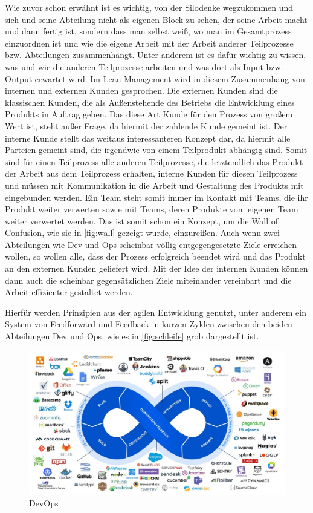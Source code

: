 Wie zuvor schon erwähnt ist es wichtig, von der Silodenke wegzukommen und sich und seine Abteilung nicht als eigenen Block zu sehen, der seine Arbeit macht und dann fertig ist, sondern dass man selbst weiß, wo man im Gesamtprozess einzuordnen  ist und wie die eigene Arbeit mit der Arbeit anderer Teilprozesse bzw. Abteilungen zusammenhängt. Unter anderem ist es dafür wichtig zu wissen, was und wie die anderen Teilprozesse arbeiten und was dort als Input bzw. Output erwartet wird. Im Lean Management wird in diesem Zusammenhang von internen und externen Kunden gesprochen. Die externen Kunden sind die klassischen Kunden, die als Außenstehende des Betriebs die Entwicklung eines Produkts in Auftrag geben. Das diese Art Kunde für den Prozess von großem Wert ist, steht außer Frage, da hiermit der zahlende Kunde gemeint ist. Der interne Kunde stellt das weitaus interessanteren Konzept dar, da hiermit alle Parteien gemeint sind, die irgendwie von einem Teilprodukt abhängig sind. Somit sind für einen Teilprozess alle anderen Teilprozesse, die letztendlich das Produkt der Arbeit aus dem Teilprozess erhalten, interne Kunden für diesen Teilprozess und müssen mit Kommunikation in die Arbeit und Gestaltung des Produkts mit eingebunden werden. Ein Team steht somit immer im Kontakt mit Teams, die ihr Produkt weiter verwerten sowie mit Teams, deren Produkte vom eigenen Team weiter verwertet werden. Das ist somit schon ein Konzept, um die Wall of Confusion, wie sie in \autoref{fig:wall} gezeigt wurde, einzureißen. Auch wenn zwei Abteilungen wie Dev und Ops scheinbar völlig entgegengesetzte Ziele erreichen wollen, so wollen alle, dass der Prozess erfolgreich beendet wird und das Produkt an den externen Kunden geliefert wird. Mit der Idee der internen Kunden können dann auch die scheinbar gegensätzlichen Ziele miteinander vereinbart und die Arbeit effizienter gestaltet werden.

Hierfür werden Prinzipien aus der agilen Entwicklung genutzt, unter anderem ein System von Feedforward und Feedback in kurzen Zyklen zwischen den beiden Abteilungen Dev und Ops, wie es in \autoref{fig:schleife} grob dargestellt ist.

\begin{figure}[h]
\centering
\includegraphics[width=\textwidth]{Graphics/devops}
\caption{\ac{DevOps} \cite{uplink:2021}}
\label{fig:schleife}
\end{figure}

